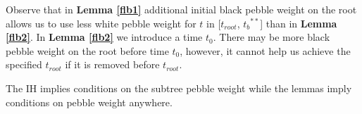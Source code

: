\documentclass[oribib1]{llncs}
\newtheorem{obs}[theorem]{Observation}
\newcommand{\troot}{t_{root}}
\newcommand{\troots}{{t_{root}}^*}
\newcommand{\tbss}{{t_b}^{**}}
\begin{document}
\medskip


Observe that in {\bf Lemma \ref{flb1}} additional initial black pebble
weight on the root allows us to use less white pebble weight for $t$ in
[$\troot$, $\tbss$] than in {\bf Lemma \ref{flb2}}.
%
In {\bf Lemma \ref{flb2}} we introduce a time $t_0$. There may be more
black pebble weight on the root before time $t_0$, however, it cannot help us achieve the specified $\troot$ if it is removed before $\troot$.
%

The IH implies conditions on the subtree pebble weight while the lemmas imply conditions on pebble weight anywhere.
%

\bigskip
\noindent
\end{document}
